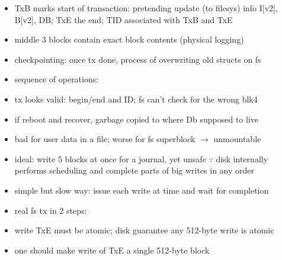 \begin{itemize}
\item TxB marks start of transaction: pretending update (to filesys) info I[v2], B[v2], DB; TxE the end; TID associated with TxB and TxE
\item middle 3 blocks contain exact block contents (physical logging)
\item checkpointing: once tx done, process of overwriting old structs on fs
\item sequence of operations:
\item tx looks valid: begin/end and ID; fs can't check for the wrong blk4
\item if reboot and recover, garbage copied to where Db supposed to live
\item bad for user data in a file; worse for fs superblock $\to$ unmountable
\end{itemize}
\begin{itemize}
\item ideal: write 5 blocks at once for a journal, yet unsafe $\because$ disk internally performs scheduling and complete parts of big writes in any order
\item simple but slow way: issue each write at time and wait for completion
\item real fs tx in 2 steps:
\item write TxE must be atomic; disk guarantee any 512-byte write is atomic
\item one should make write of TxE a single 512-byte block
\end{itemize}
